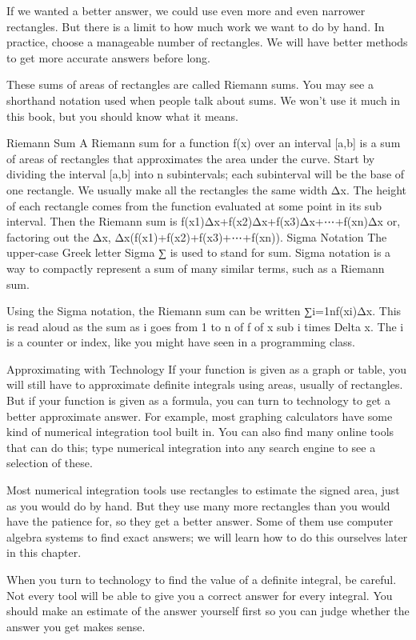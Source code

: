 If we wanted a better answer, we could use even more and even narrower rectangles. But there is a limit to how much work we want to do by hand. In practice, choose a manageable number of rectangles. We will have better methods to get more accurate answers before long.

These sums of areas of rectangles are called Riemann sums. You may see a shorthand notation used when people talk about sums. We won't use it much in this book, but you should know what it means.

Riemann Sum
A Riemann sum for a function f(x) over an interval [a,b] is a sum of areas of rectangles that approximates the area under the curve. Start by dividing the interval [a,b] into n subintervals; each subinterval will be the base of one rectangle. We usually make all the rectangles the same width Δx. The height of each rectangle comes from the function evaluated at some point in its sub interval. Then the Riemann sum is
f(x1)Δx+f(x2)Δx+f(x3)Δx+⋯+f(xn)Δx
or, factoring out the Δx,
Δx(f(x1)+f(x2)+f(x3)+⋯+f(xn)).
Sigma Notation
The upper-case Greek letter Sigma ∑ is used to stand for sum. Sigma notation is a way to compactly represent a sum of many similar terms, such as a Riemann sum.

Using the Sigma notation, the Riemann sum can be written
∑i=1nf(xi)Δx.
This is read aloud as the sum as i goes from 1 to n of f of x sub i times Delta x. The i is a counter or index, like you might have seen in a programming class.

Approximating with Technology
If your function is given as a graph or table, you will still have to approximate definite integrals using areas, usually of rectangles. But if your function is given as a formula, you can turn to technology to get a better approximate answer. For example, most graphing calculators have some kind of numerical integration tool built in. You can also find many online tools that can do this; type numerical integration into any search engine to see a selection of these.

Most numerical integration tools use rectangles to estimate the signed area, just as you would do by hand. But they use many more rectangles than you would have the patience for, so they get a better answer. Some of them use computer algebra systems to find exact answers; we will learn how to do this ourselves later in this chapter.

When you turn to technology to find the value of a definite integral, be careful. Not every tool will be able to give you a correct answer for every integral. You should make an estimate of the answer yourself first so you can judge whether the answer you get makes sense.


